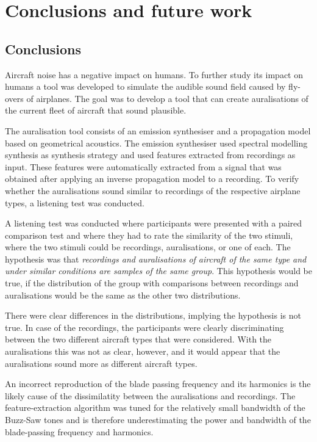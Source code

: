 \chapter{Conclusions and future work}\label{chapter:conclusions}

\section{Conclusions}


Aircraft noise has a negative impact on humans. To further study its impact on
humans a tool was developed to simulate the audible sound field caused by
fly-overs of airplanes. The goal was to develop a tool that can create
auralisations of the current fleet of aircraft that sound plausible.

The auralisation tool consists of an emission synthesiser and a propagation
model based on geometrical acoustics. The emission synthesiser used spectral
modelling synthesis as synthesis strategy and used features extracted from
recordings as input. These features were automatically extracted from a signal
that was obtained after applying an inverse propagation model to a recording.
To verify whether the auralisations sound similar to recordings of the
respective airplane types, a listening test was conducted.

A listening test was conducted where participants were presented with a paired
comparison test and where they had to rate the similarity of the two stimuli,
where the two stimuli could be recordings, auralisations, or one of each. The
hypothesis was that \emph{recordings and auralisations of aircraft of the same
type and under similar conditions are samples of the same group}. This
hypothesis would be true, if the distribution of the group with comparisons
between recordings and auralisations would be the same as the other two
distributions.

There were clear differences in the distributions, implying the hypothesis is
not true. In case of the recordings, the participants were clearly discriminating
between the two different aircraft types that were considered. With the
auralisations this was not as clear, however, and it would appear that the
auralisations sound more as different aircraft types.

An incorrect reproduction of the blade passing frequency and its harmonics is
the likely cause of the dissimilatity between the auralisations and recordings.
The feature-extraction algorithm was tuned for the relatively small bandwidth of
the Buzz-Saw tones and is therefore underestimating the power and bandwidth of
the blade-passing frequency and harmonics.

